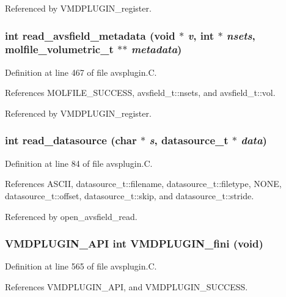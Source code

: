 Referenced by VMDPLUGIN\_\-register.
\subsubsection{\setlength{\rightskip}{0pt plus 5cm}int read\_\-avsfield\_\-metadata (void $\ast$ {\em v}, int $\ast$ {\em nsets}, {\bf molfile\_\-volumetric\_\-t} $\ast$$\ast$ {\em metadata})\hspace{0.3cm}{\tt  [static]}}\label{avsplugin_8C_a13}




Definition at line 467 of file avsplugin.C.

References MOLFILE\_\-SUCCESS, avsfield\_\-t::nsets, and avsfield\_\-t::vol.

Referenced by VMDPLUGIN\_\-register.
\subsubsection{\setlength{\rightskip}{0pt plus 5cm}int read\_\-datasource (char $\ast$ {\em s}, {\bf datasource\_\-t} $\ast$ {\em data})\hspace{0.3cm}{\tt  [static]}}\label{avsplugin_8C_a11}




Definition at line 84 of file avsplugin.C.

References ASCII, datasource\_\-t::filename, datasource\_\-t::filetype, NONE, datasource\_\-t::offset, datasource\_\-t::skip, and datasource\_\-t::stride.

Referenced by open\_\-avsfield\_\-read.
\subsubsection{\setlength{\rightskip}{0pt plus 5cm}VMDPLUGIN\_\-API int VMDPLUGIN\_\-fini (void)}\label{avsplugin_8C_a17}




Definition at line 565 of file avsplugin.C.

References VMDPLUGIN\_\-API, and VMDPLUGIN\_\-SUCCESS.
